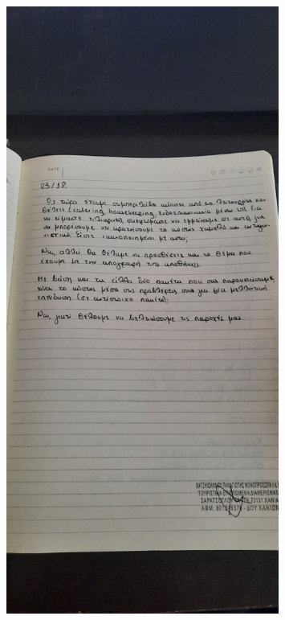 \begin{figure}[H]
	\centering
	\includegraphics[angle=270, width=0.8\textwidth]{Images/p3}
\end{figure}
